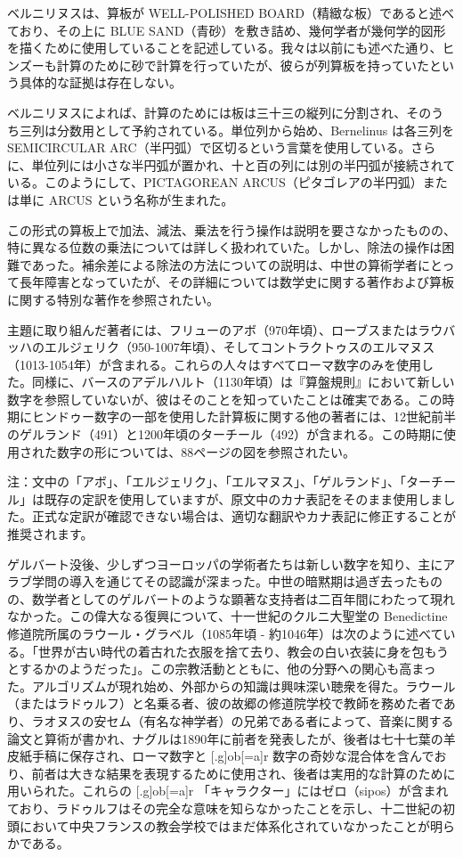\documentclass[a4paper,11pt,openany]{ltjsbook}
\begin{document}
ベルニリヌスは、算板が WELL-POLISHED BOARD（精緻な板）であると述べており、その上に BLUE SAND（青砂）を敷き詰め、幾何学者が幾何学的図形を描くために使用していることを記述している。我々は以前にも述べた通り、ヒンズーも計算のために砂で計算を行っていたが、彼らが列算板を持っていたという具体的な証拠は存在しない。

ベルニリヌスによれば、計算のためには板は三十三の縦列に分割され、そのうち三列は分数用として予約されている。単位列から始め、Bernelinus は各三列を SEMICIRCULAR ARC（半円弧）で区切るという言葉を使用している。さらに、単位列には小さな半円弧が置かれ、十と百の列には別の半円弧が接続されている。このようにして、PICTAGOREAN ARCUS（ピタゴレアの半円弧）または単に ARCUS という名称が生まれた。

この形式の算板上で加法、減法、乗法を行う操作は説明を要さなかったものの、特に異なる位数の乗法については詳しく扱われていた。しかし、除法の操作は困難であった。補余差による除法の方法についての説明は、中世の算術学者にとって長年障害となっていたが、その詳細については数学史に関する著作および算板に関する特別な著作を参照されたい。

主題に取り組んだ著者には、フリューのアボ（970年頃）、ローブスまたはラウバッハのエルジェリク（950-1007年頃）、そしてコントラクトゥスのエルマヌス（1013-1054年）が含まれる。これらの人々はすべてローマ数字のみを使用した。同様に、バースのアデルハルト（1130年頃）は『算盤規則』において新しい数字を参照していないが、彼はそのことを知っていたことは確実である。この時期にヒンドゥー数字の一部を使用した計算板に関する他の著者には、12世紀前半のゲルランド（491）と1200年頃のターチール（492）が含まれる。この時期に使用された数字の形については、88ページの図を参照されたい。

注：文中の「アボ」、「エルジェリク」、「エルマヌス」、「ゲルランド」、「ターチール」は既存の定訳を使用していますが、原文中のカナ表記をそのまま使用しました。正式な定訳が確認できない場合は、適切な翻訳やカナ表記に修正することが推奨されます。

ゲルバート没後、少しずつヨーロッパの学術者たちは新しい数字を知り、主にアラブ学問の導入を通じてその認識が深まった。中世の暗黙期は過ぎ去ったものの、数学者としてのゲルバートのような顕著な支持者は二百年間にわたって現れなかった。この偉大なる復興について、十一世紀のクルニ大聖堂の Benedictine 修道院所属のラウール・グラベル（1085年頃 - 約1046年）は次のように述べている。「世界が古い時代の着古れた衣服を捨て去り、教会の白い衣装に身を包もうとするかのようだった」。この宗教活動とともに、他の分野への関心も高まった。アルゴリズムが現れ始め、外部からの知識は興味深い聴衆を得た。ラウール（またはラドゥルフ）と名乗る者、彼の故郷の修道院学校で教師を務めた者であり、ラオヌスの安セム（有名な神学者）の兄弟である者によって、音楽に関する論文と算術が書かれ、ナグルは1890年に前者を発表したが、後者は七十七葉の羊皮紙手稿に保存され、ローマ数字と [.g]ob[=a]r 数字の奇妙な混合体を含んでおり、前者は大きな結果を表現するために使用され、後者は実用的な計算のために用いられた。これらの [.g]ob[=a]r 「キャラクター」にはゼロ（sipos）が含まれており、ラドゥルフはその完全な意味を知らなかったことを示し、十二世紀の初頭において中央フランスの教会学校ではまだ体系化されていなかったことが明らかである。
\end{document}
